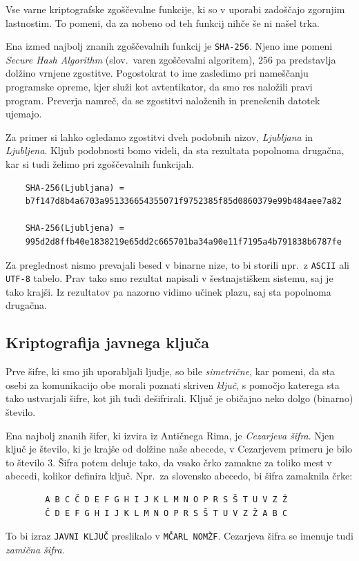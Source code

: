 \documentclass[isrm2, tisk]{fmfdelo}
\begin{document}
\begin{opomba}
    Vse varne kriptografske zgoščevalne funkcije, ki so v uporabi zadoščajo zgornjim lastnostim. To
    pomeni, da za nobeno od teh funkcij nihče še ni našel trka.
\end{opomba}

\begin{primer}
    Ena izmed najbolj znanih zgoščevalnih funkcij je \texttt{SHA-256}. Njeno ime pomeni \textit{Secure
    Hash Algorithm} (slov.\ varen zgoščevalni algoritem), $256$ pa predstavlja dolžino vrnjene zgostitve.
    Pogostokrat to ime zasledimo pri nameščanju programske opreme, kjer služi kot avtentikator, da smo res
    naložili pravi program. Preverja namreč, da se zgostitvi naloženih in prenešenih datotek ujemajo.

    Za primer si lahko ogledamo zgostitvi dveh podobnih nizov, \textit{Ljubljana} in \textit{Ljubljena}. 
    Kljub podobnosti bomo videli, da sta rezultata popolnoma drugačna, kar si tudi želimo pri zgoščevalnih 
    funkcijah.
    \begin{verbatim}
    SHA-256(Ljubljana) =
    b7f147d8b4a6703a951336654355071f9752385f85d0860379e99b484aee7a82

    SHA-256(Ljubljena) =
    995d2d8ffb40e1838219e65dd2c665701ba34a90e11f7195a4b791838b6787fe
    \end{verbatim}
    Za preglednost nismo prevajali besed v binarne nize, to bi storili npr.\ z \texttt{ASCII} ali \texttt{UTF-8}
    tabelo. Prav tako smo rezultat napisali v šestnajstiškem sistemu, saj je tako krajši. Iz rezultatov
    pa nazorno vidimo učinek plazu, saj sta popolnoma drugačna.
\end{primer}

\subsection{Kriptografija javnega ključa}
Prve šifre, ki smo jih uporabljali ljudje, so bile \textit{simetrične}, kar pomeni, da sta osebi
za komunikacijo obe morali poznati skriven \textit{ključ}, s pomočjo katerega sta tako ustvarjali
šifre, kot jih tudi dešifrirali. Ključ je običajno neko dolgo (binarno) število.

\begin{primer}
    Ena najbolj znanih šifer, ki izvira iz Antičnega Rima, je \textit{Cezarjeva šifra}. Njen ključ 
    je število, ki je krajše od dolžine naše abecede, v Cezarjevem primeru je bilo to število $3$.
    Šifra potem deluje tako, da vsako črko zamakne za toliko mest v abecedi, kolikor definira 
    ključ. Npr.\ za slovensko abecedo, bi šifra zamaknila črke:
    \begin{verbatim}
        A B C Č D E F G H I J K L M N O P R S Š T U V Z Ž
        Č D E F G H I J K L M N O P R S Š T U V Z Ž A B C
    \end{verbatim}
    To bi izraz \texttt{JAVNI KLJUČ} preslikalo v \texttt{MČARL NOMŽF}. Cezarjeva šifra se imenuje 
    tudi \textit{zamična šifra}.
\end{primer}
\end{document}
